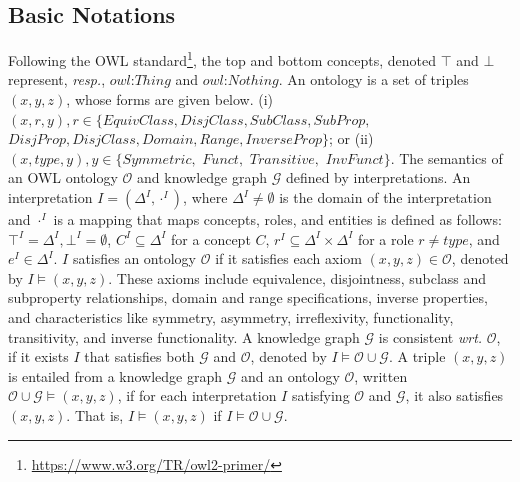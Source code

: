 \documentclass[sigconf]{acmart}
\begin{document}
\subsection{Basic Notations}\label{sect:notations}
Following the OWL standard\footnote{\url{https://www.w3.org/TR/owl2-primer/}}, 
the top and bottom concepts, denoted $\top$ and $\bot$ represent, \textit{resp.}, $owl$:$Thing$ and $owl$:$Nothing$. An ontology is a set of triples $(x,y,z)$, whose forms   are given below. 
(i) $(x,r,y), r\in\{EquivClass, DisjClass, SubClass, SubProp,$ $DisjProp, DisjClass, Domain, Range, InverseProp\}$; or (ii) $(x,type, y), y\in\{Symmetric,$ $Funct,$ $Transitive, $ $ InvFunct\}$.
The semantics of an OWL ontology $\mathcal{O}$ and knowledge graph $\mathcal{G}$ defined by interpretations. 
An interpretation 
$I=(\Delta^I, \cdot^I)$, where $\Delta^I\not=\emptyset$ is the domain of the interpretation and $\cdot^I$ is a mapping that maps concepts, roles, and entities is defined as follows: $\top^I=\Delta^I, \bot^I=\emptyset$, 
$C^I\subseteq \Delta^I$ for a concept $C$, $r^I\subseteq \Delta^I\times \Delta^I$ for a role $r\not= type$, and $e^I \in\Delta^I$. $I$ satisfies an ontology $\mathcal{O}$ if it satisfies each axiom $(x,y,z)\in \mathcal{O}$, denoted by $I\models (x,y,z)$.
These axioms include equivalence, disjointness, subclass and subproperty relationships, domain and range specifications, inverse properties, and characteristics like symmetry, asymmetry, irreflexivity, functionality, transitivity, and inverse functionality. A knowledge graph
$\mathcal{G}$ is  consistent \textit{wrt.}  $\mathcal{O}$, if it exists $I$ that satisfies both  $\mathcal{G}$  and  $\mathcal{O}$, denoted by $I \models \mathcal{O}\cup\mathcal{G}$. A triple $(x,y,z)$ is entailed from  a knowledge graph $\mathcal{G}$  and an ontology $\mathcal{O}$, written $\mathcal{O}\cup\mathcal{G}\models (x,y,z)$, if for each interpretation $I$ satisfying  $\mathcal{O}$ and  $\mathcal{G}$, it also satisfies $(x,y,z)$. That is, $I\models (x,y,z)$  if $I\models \mathcal{O}\cup\mathcal{G}$.
\end{document}
